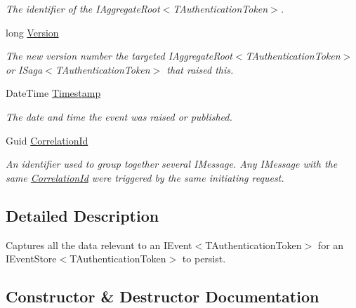 \begin{DoxyCompactItemize}
\begin{DoxyCompactList}\small\item\em The identifier of the I\+Aggregate\+Root$<$\+T\+Authentication\+Token$>$. \end{DoxyCompactList}\item 
long \hyperlink{classCqrs_1_1Events_1_1EventData_a6abb7d888f3bba44c081587aacab0181_a6abb7d888f3bba44c081587aacab0181}{Version}
\begin{DoxyCompactList}\small\item\em The new version number the targeted I\+Aggregate\+Root$<$\+T\+Authentication\+Token$>$ or I\+Saga$<$\+T\+Authentication\+Token$>$ that raised this. \end{DoxyCompactList}\item 
Date\+Time \hyperlink{classCqrs_1_1Events_1_1EventData_ace1a7435af5c3fd14cfb2dc095d12a85_ace1a7435af5c3fd14cfb2dc095d12a85}{Timestamp}
\begin{DoxyCompactList}\small\item\em The date and time the event was raised or published. \end{DoxyCompactList}\item 
Guid \hyperlink{classCqrs_1_1Events_1_1EventData_a8d854d86e700a99f7cede8cda598d271_a8d854d86e700a99f7cede8cda598d271}{Correlation\+Id}
\begin{DoxyCompactList}\small\item\em An identifier used to group together several I\+Message. Any I\+Message with the same \hyperlink{classCqrs_1_1Events_1_1EventData_a8d854d86e700a99f7cede8cda598d271_a8d854d86e700a99f7cede8cda598d271}{Correlation\+Id} were triggered by the same initiating request. \end{DoxyCompactList}\end{DoxyCompactItemize}


\subsection{Detailed Description}
Captures all the data relevant to an I\+Event$<$\+T\+Authentication\+Token$>$ for an I\+Event\+Store$<$\+T\+Authentication\+Token$>$ to persist. 



\subsection{Constructor \& Destructor Documentation}
\mbox{\label{classCqrs_1_1Events_1_1EventData_a0387ea22e5cdc085caf113a82f5ace18_a0387ea22e5cdc085caf113a82f5ace18}} 
